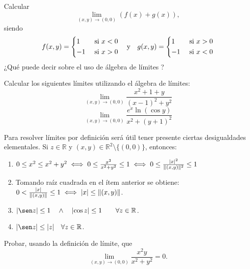 \begin{tarea} Calcular $$ \lim_{(x,y) \to (0,0)}  (f(x) + g(x)),$$ siendo
 $$f(x,y) = 
     \begin{dcases}
         1  &  \text{ si } x < 0  \\
        -1                 & \text{ si }  x>0
     \end{dcases} \:\:\:  \text{ y }    \:\:\:  
  g(x,y) = 
     \begin{dcases}
         1  &  \text{ si } x > 0  \\
        -1                 & \text{ si }  x<0
     \end{dcases}$$   ¿Qu\'e puede decir sobre el uso de \'algebra de l\'imites ?
\end{tarea}

\begin{tarea} 
Calcular los siguientes l\'imites utilizando el \'algebra de l\'imites: 
\[ 
\lim_{(x,y) \to (0,0)} \frac{x^2 + 1 + y}{(x-1)^2 + y^2} 
\] 
\[ 
\lim_{(x,y) \to (0,0)} \frac{e^x \ln(\cos y)}{x^2 + (y+1)^2} 
\] 
\end{tarea}


\begin{obs} \label{obs:desigualdades_utiles} 
Para resolver l\'imites por definici\'on ser\'a \'util tener presente ciertas desigualdades elementales. Si $z \in \mathbb{R}$ y $(x,y) \in \mathbb{R}^{2} \setminus \{ (0,0) \}$, entonces: 
\begin{enumerate} 
\item $0 \le x^2 \le x^2+y^2 \iff 0 \le \frac{x^2}{x^2+y^2} \le 1 \iff 0 \le \frac{\abs{x}^2}{\lVert (x,y) \rVert^2} \le 1$ 
\item Tomando ra\'iz cuadrada en el \'item anterior se obtiene: \; $0 < \frac{\abs{x}}{\lVert (x,y) \rVert} \le 1 \iff \abs{x} \le \lVert (x,y) \rVert$.
\item $\abs{\sen z} \le 1 \quad \land \quad \abs{\cos z} \le 1  \quad  \quad \forall z \in \mathbb{R}$. 
\item $\abs{\sen z} \le \abs{z} \quad \forall z \in \mathbb{R} $. 
\end{enumerate} 
\end{obs}


\begin{example} 
Probar, usando la definici\'on de l\'imite, que 
\[ 
\lim_{(x,y) \to (0,0)} \frac{x^2 y}{x^2 + y^2} = 0. 
\] 
\end{example} 

